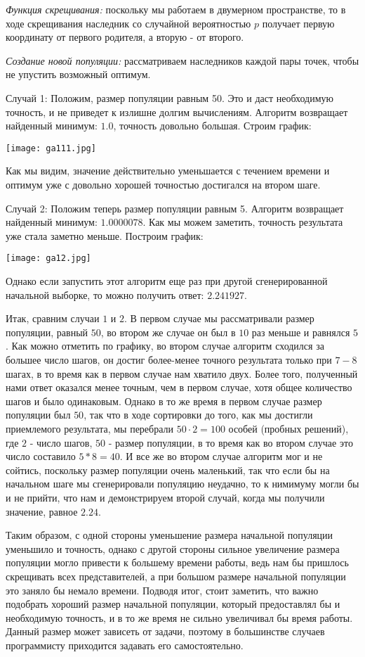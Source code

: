 \documentclass[a4paper,11pt,russian]{article}
\begin{document}
\textit{Функция скрещивания:} поскольку мы работаем в двумерном пространстве, то в ходе скрещивания наследник со случайной вероятностью $p$ получает первую координату от первого родителя, а вторую - от второго. 

\textit{Создание новой популяции:} рассматриваем наследников каждой пары точек, чтобы не упустить возможный оптимум.

Случай 1: Положим, размер популяции равным 50. Это и даст необходимую точность, и не приведет к излишне долгим вычислениям. Алгоритм возвращает найденный минимум: $1.0$, точность довольно большая. Строим график:

{\texttt{[image: ga111.jpg]}}

Как мы видим, значение действительно уменьшается с течением времени и оптимум уже с довольно хорошей точностью достигался на втором шаге. 

Случай 2: Положим теперь размер популяции равным 5. Алгоритм возвращает найденный минимум: $1.0000078$. Как мы можем заметить, точность результата уже стала заметно меньше. Построим график:

{\texttt{[image: ga12.jpg]}}

Однако если запустить этот алгоритм еще раз при другой сгенерированной начальной выборке, то можно получить ответ: $2.241927$. 

Итак, сравним случаи $1$ и $2$. В первом случае мы рассматривали размер популяции, равный $50$, во втором же случае он был в $10$ раз меньше и равнялся $5$. Как можно отметить по графику, во втором случае алгоритм сходился за большее число шагов, он достиг более-менее точного результата только при $7-8$ шагах, в то время как в первом случае нам хватило двух. Более того, полученный нами ответ оказался менее точным, чем в первом случае, хотя общее количество шагов и было одинаковым. Однако в то же время в первом случае размер популяции был $50$, так что в ходе сортировки до того, как мы достигли приемлемого результата, мы перебрали $50 \cdot 2 = 100$ особей (пробных решений), где $2$ - число шагов, $50$ - размер популяции, в то время как во втором случае это число составило $5*8=40$. И все же во втором случае алгоритм мог и не сойтись, поскольку размер популяции очень маленький, так что если бы на начальном шаге мы сгенерировали популяцию неудачно, то к нимимуму могли бы и не прийти, что нам и демонстрируем второй случай, когда мы получили значение, равное $2.24$.

Таким образом, с одной стороны уменьшение размера начальной популяции уменьшило и точность, однако с другой стороны сильное увеличение размера популяции могло привести к большему времени работы, ведь нам бы пришлось скрещивать всех представителей, а при большом размере начальной популяции это заняло бы немало времени. Подводя итог, стоит заметить, что важно подобрать хороший размер начальной популяции, который предоставлял бы и необходимую точность, и в то же время не сильно увеличивал бы время работы. Данный размер может зависеть от задачи, поэтому в большинстве случаев программисту приходится задавать его самостоятельно.
\end{document}

